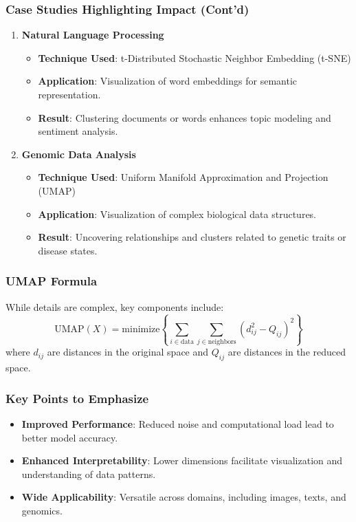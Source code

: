 \documentclass[aspectratio=169]{beamer}
\begin{document}
\begin{frame}[fragile]
    \frametitle{Case Studies Highlighting Impact (Cont'd)}
    \begin{enumerate}[resume]
        \item \textbf{Natural Language Processing}
        \begin{itemize}
            \item \textbf{Technique Used}: t-Distributed Stochastic Neighbor Embedding (t-SNE)
            \item \textbf{Application}: Visualization of word embeddings for semantic representation.
            \item \textbf{Result}: Clustering documents or words enhances topic modeling and sentiment analysis.
        \end{itemize}
        
        \item \textbf{Genomic Data Analysis}
        \begin{itemize}
            \item \textbf{Technique Used}: Uniform Manifold Approximation and Projection (UMAP)
            \item \textbf{Application}: Visualization of complex biological data structures.
            \item \textbf{Result}: Uncovering relationships and clusters related to genetic traits or disease states.
        \end{itemize}
    \end{enumerate}
\end{frame}

\begin{frame}[fragile]
    \frametitle{UMAP Formula}
    While details are complex, key components include:
    \begin{equation}
        \text{UMAP}(X) = \text{minimize} \left\{ \sum_{i \in \text{data}} \sum_{j \in \text{neighbors}} (d_{ij}^2 - Q_{ij})^2 \right\}
    \end{equation}
    where \(d_{ij}\) are distances in the original space and \(Q_{ij}\) are distances in the reduced space.
\end{frame}

\begin{frame}[fragile]
    \frametitle{Key Points to Emphasize}
    \begin{itemize}
        \item \textbf{Improved Performance}: Reduced noise and computational load lead to better model accuracy.
        \item \textbf{Enhanced Interpretability}: Lower dimensions facilitate visualization and understanding of data patterns.
        \item \textbf{Wide Applicability}: Versatile across domains, including images, texts, and genomics.
    \end{itemize}
\end{frame}
\end{document}

